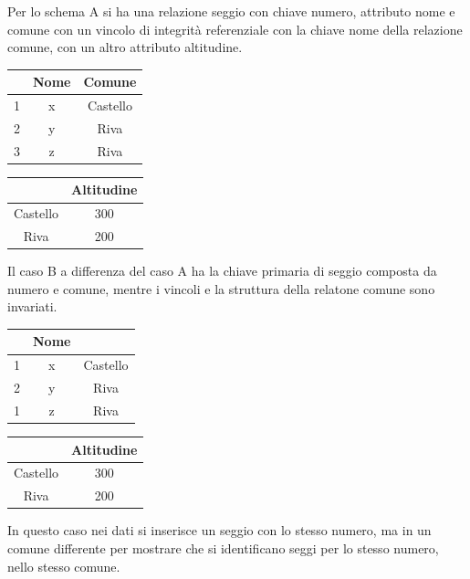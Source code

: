 \documentclass{article}
\newcommand{\myuline}[1]{%
    \uline{\phantom{#1}}%
    \llap{\contour{white}{#1}}%
}
\begin{document}
Per lo schema A si ha una relazione seggio con chiave numero, attributo nome e comune con un vincolo di integrità referenziale con la chiave nome 
della relazione comune, con un altro attributo altitudine. 
\begin{center}
    \begin{tabular}{|c|c|c|}
        \hline 
        \myuline{Numero} & Nome & Comune\\
        \hline
        1 & x & Castello\\
        \hline
        2 & y & Riva\\
        \hline
        3 & z & Riva\\
        \hline
    \end{tabular}
    \begin{tabular}{|c|c|}
        \hline
        \myuline{Nome} & Altitudine\\
        \hline
        Castello & 300\\
        \hline
        Riva & 200\\
        \hline
    \end{tabular}
\end{center}
Il caso B a differenza del caso A ha la chiave primaria di seggio composta da numero e comune, mentre i vincoli e la struttura della relatone 
comune sono invariati. 
\begin{center}
    \begin{tabular}{|c|c|c|}
        \hline 
        \myuline{Numero} & Nome & \myuline{Comune}\\
        \hline
        1 & x & Castello\\
        \hline
        2 & y & Riva\\
        \hline
        1 & z & Riva\\
        \hline
    \end{tabular}
    \begin{tabular}{|c|c|}
        \hline
        \myuline{Nome} & Altitudine\\
        \hline
        Castello & 300\\
        \hline
        Riva & 200\\
        \hline
    \end{tabular}
\end{center}
In questo caso nei dati si inserisce un seggio con lo stesso numero, ma in un comune differente per mostrare che si identificano seggi per lo 
stesso numero, nello stesso comune. 
\end{document}
